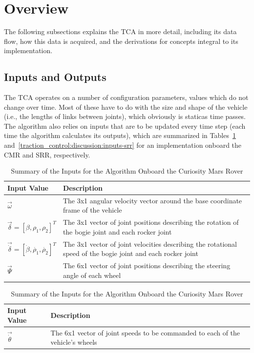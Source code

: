\acresetall
\section{Overview}
The following subsections explains the \ac{TCA} in more detail, including its data flow, how this data is acquired, and the derivations for concepts integral to its implementation.

\subsection{Inputs and Outputs}
The \ac{TCA} operates on a number of configuration parameters, values which do not change over time. Most of these have to do with the size and shape of the vehicle (i.e., the lengths of links between joints), which obviously is staticas time passes. The algorithm also relies on inputs that are to be updated every time step (each time the algorithm calculates its outputs), which are summarized in Tables~\ref{traction_control:discussion:inputs-cmr} and~\ref{traction_control:discussion:inputs-srr} for an implementation onboard the \ac{CMR} and \ac{SRR}, respectively.

\begin{table}[H]
	\centering
	\begin{tabular}{| >{\centering\arraybackslash} m{1.2in} | >{\centering\arraybackslash} m{4.5in} |}
		\hline
		\textbf{Input Value} & \textbf{Description} \\
		\hline
		$\vec{\omega}$ & The 3x1 angular velocity vector around the base coordinate frame of the vehicle \\
		\hline
		$\vec{\delta}=\left[\beta, \rho_{1}, \rho_{2}\right]^{T}$ & The 3x1 vector of joint positions describing the rotation of the bogie joint and each rocker joint \\
		\hline
		$\vec{\dot{\delta}}=\left[\dot{\beta}, \dot{\rho_{1}}, \dot{\rho_{2}}\right]^{T}$ & The 3x1 vector of joint velocities describing the rotational speed of the bogie joint and each rocker joint \\
		\hline
		$\vec{\Psi}$ & The 6x1 vector of joint positions describing the steering angle of each wheel \\
		\hline
	\end{tabular}
	\caption{Summary of the Inputs for the Algorithm Onboard the Curiosity Mars Rover}
	\label{traction_control:discussion:inputs-cmr}
\end{table}

\begin{table}[H]
	\centering
	\begin{tabular}{| >{\centering\arraybackslash} m{1.2in} | >{\centering\arraybackslash} m{4.5in} |}
		\hline
		\textbf{Input Value} & \textbf{Description} \\
		\hline
		$\vec{\dot{\theta}}$ & The 6x1 vector of joint speeds to be commanded to each of the vehicle's wheels \\
		\hline
	\end{tabular}
	\caption{Summary of the Inputs for the Algorithm Onboard the Curiosity Mars Rover}
	\label{traction_control:discussion:outputs-cmr}
\end{table}

